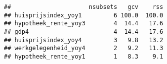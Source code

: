 \documentclass[
]{article}
\newenvironment{Shaded}{\begin{snugshade}}{\end{snugshade}}
\newcommand{\CommentTok}[1]{\textcolor[rgb]{0.56,0.35,0.01}{\textit{#1}}}
\newcommand{\DataTypeTok}[1]{\textcolor[rgb]{0.13,0.29,0.53}{#1}}
\newcommand{\KeywordTok}[1]{\textcolor[rgb]{0.13,0.29,0.53}{\textbf{#1}}}
\newcommand{\NormalTok}[1]{#1}
\newcommand{\OperatorTok}[1]{\textcolor[rgb]{0.81,0.36,0.00}{\textbf{#1}}}
\newcommand{\StringTok}[1]{\textcolor[rgb]{0.31,0.60,0.02}{#1}}
\begin{document}
\begin{Shaded}
\end{Shaded}

\begin{verbatim}
##                      nsubsets   gcv    rss
## huisprijsindex_yoy1         6 100.0  100.0
## hypotheek_rente_yoy3        4  14.4   17.6
## gdp4                        4  14.4   17.6
## huisprijsindex_yoy4         3   9.8   13.2
## werkgelegenheid_yoy4        2   9.2   11.3
## hypotheek_rente_yoy1        1   8.3    9.1
\end{verbatim}

\begin{tabular}{}
\hline

\hline
\end{tabular}
\end{document}
